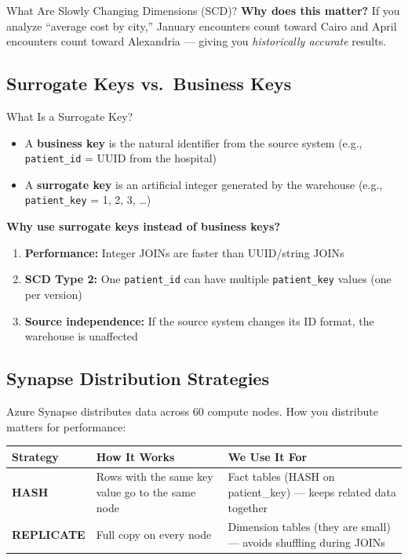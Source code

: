 \documentclass[12pt, a4paper, oneside]{report}
\begin{document}
\begin{conceptbox}{What Are Slowly Changing Dimensions (SCD)?}
\textbf{Why does this matter?} If you analyze ``average cost by city,'' January encounters count toward Cairo and April encounters count toward Alexandria --- giving you \textit{historically accurate} results.
\end{conceptbox}

\subsection{Surrogate Keys vs.\ Business Keys}

\begin{conceptbox}{What Is a Surrogate Key?}
\begin{itemize}
    \item A \textbf{business key} is the natural identifier from the source system (e.g., \texttt{patient\_id} = UUID from the hospital)
    \item A \textbf{surrogate key} is an artificial integer generated by the warehouse (e.g., \texttt{patient\_key} = 1, 2, 3, \ldots)
\end{itemize}

\textbf{Why use surrogate keys instead of business keys?}
\begin{enumerate}
    \item \textbf{Performance:} Integer JOINs are faster than UUID/string JOINs
    \item \textbf{SCD Type 2:} One \texttt{patient\_id} can have multiple \texttt{patient\_key} values (one per version)
    \item \textbf{Source independence:} If the source system changes its ID format, the warehouse is unaffected
\end{enumerate}
\end{conceptbox}

\subsection{Synapse Distribution Strategies}

Azure Synapse distributes data across 60 compute nodes. How you distribute matters for performance:

\begin{center}
\begin{tabular}{>{\bfseries}p{3cm} p{4.5cm} p{5cm}}
    \toprule
    \textbf{Strategy} & \textbf{How It Works} & \textbf{We Use It For} \\
    \midrule
    HASH & Rows with the same key value go to the same node & Fact tables (HASH on patient\_key) --- keeps related data together \\
    REPLICATE & Full copy on every node & Dimension tables (they are small) --- avoids shuffling during JOINs \\
    \bottomrule
\end{tabular}
\end{center}
\end{document}
